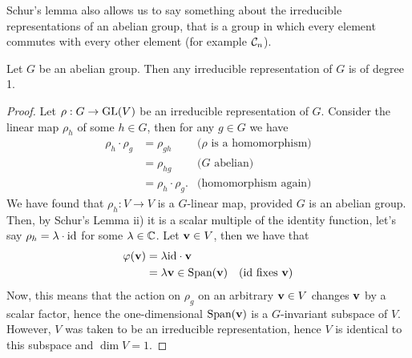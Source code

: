 
Schur's lemma also allows us to say something about the irreducible representations of an abelian group, that is a group in which every element commutes with every other element (for example $\mathcal{C}_n$).

\begin{corollary}\label{cor:abelianirred}
	Let $G$ be an abelian group. Then any irreducible representation of $G$ is of degree 1.
\end{corollary}
\begin{proof}\cite[\textit{Mentioned in passing in} Sect.1.3.]{FultonHarris}
	Let $\rho: G \rightarrow \text{GL}(V)$ be an irreducible representation of $G$. Consider the linear map $\rho_h$ of some $h \in G$, then for any $g \in G$ we have
	\begin{align*}
		\rho_h \cdot \rho_g &= \rho_{gh} & \text{($\rho$ is a homomorphism)} \\
		&= \rho_{hg} & \text{($G$ abelian)} \\
		&= \rho_h \cdot \rho_g. & \text{(homomorphism again)}
	\end{align*}
	We have found that $\rho_h: V \rightarrow V$ is a $G$-linear map, provided $G$ is an abelian group. Then, by Schur's Lemma ii) it is a scalar multiple of the identity function, let's say $\rho_h = \lambda \cdot \text{id}$ for some $\lambda \in \mathbb{C}$. Let $\mathbf{v} \in V$, then we have that
	\begin{align*}
		\varphi(\mathbf{v}) &= \lambda \text{id} \cdot \mathbf{v} \\
		&= \lambda \mathbf{v} \in \text{Span}(\mathbf{v}) & \text{($\text{id}$ fixes $\mathbf{v}$)}
	\end{align*}
	Now, this means that the action on $\rho_g$ on an arbitrary $\mathbf{v} \in V$ changes $\mathbf{v}$ by a scalar factor, hence the one-dimensional $\text{Span}(\mathbf{v})$ is a $G$-invariant subspace of $V$. However, $V$ was taken to be an irreducible representation, hence $V$ is identical to this subspace and $\dim V = 1$.
\end{proof}


